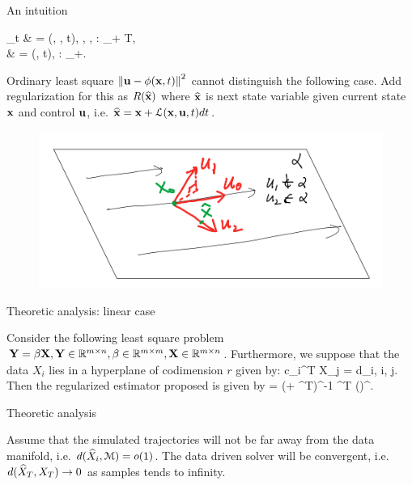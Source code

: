 \documentclass{beamer}
\begin{document}
\begin{frame}{An intuition}	
	\bequn
		\begin{aligned}
			\p_t \mfx & = \mcL(\mfx, \mfu, t), \quad \mfx \in \mcX, \mfu \in \mcU, \mcL: \mcX \times \mcU \times \mbR_+ \rightarrow T\mcX,			\\
			\mfu & = \phi(\mfx, t), \quad \phi: \mcX \times \mbR_+\rightarrow \mfu.
		\end{aligned}
	\eequn
	Ordinary least square $\left\| \mathbf{u} - \phi(\mathbf{x}, t) \right\|^2$ cannot distinguish the following case. Add regularization for this as $R(\widehat {\mathbf{x}})$ where $\widehat {\mathbf{x}}$ is next state variable given current state $\mathbf{x}$ and control $\mathbf{u}$, i.e. $\widehat {\mathbf{x}} = \mathbf{x} + \mathcal{L}(\mathbf{x}, \mathbf{u}, t)dt$.
	\begin{figure}[H]
          \centering
          \centerline{\includegraphics[width=0.9\linewidth]{fig/mfd.png}}
        \end{figure}
\end{frame}


\begin{frame}{Theoretic analysis: linear case}
	\begin{Thm}
		Consider the following least square problem $\mathbf{Y} = \beta \mathbf{X}, \mathbf{Y} \in \mathbb{R}^{m\times n}, \beta \in \mathbb{R}^{m\times m}, \mathbf{X} \in \mathbb{R}^{m\times n}$. Furthermore, we suppose that the data $X_i$ lies in a hyperplane of codimension $r$ given by:
		\bequn
			c_i^T X_j = d_i, \forall i, j.
		\eequn
		Then the regularized estimator proposed is given by
		\bequn
			\wht \beta = (\mfI + \lambda \mfC \mfC^T)^{-1} \mfY\mfX^T (\mfX\mfX)^{\dagger}.
		\eequn
	\end{Thm}
\end{frame}


\begin{frame}{Theoretic analysis}
	\begin{Thm}[Informal]
		Assume that the simulated trajectories will not be far away from the data manifold, i.e. $d(\widehat X_i, \mathcal{M}) = o(1)$. The data driven solver will be convergent, i.e. $d(\widehat X_T, X_T) \rightarrow 0$ as samples tends to infinity.
	\end{Thm}
\end{frame}
\end{document}
